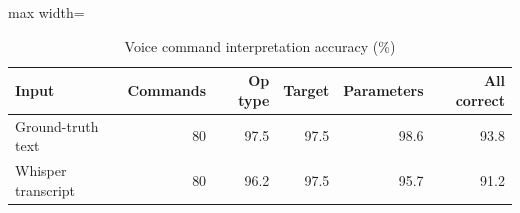 \begin{table}[t]
\centering
\scriptsize
\caption{Voice command interpretation accuracy (\%)}
\label{tab:voice}
\setlength{\tabcolsep}{3.5pt}
\begin{adjustbox}{max width=\columnwidth}
\begin{tabular}{lrrrrr}
\toprule
\textbf{Input} & \textbf{Commands} & \textbf{Op type} & \textbf{Target} & \textbf{Parameters} & \textbf{All correct} \\
\midrule
Ground-truth text & 80 & 97.5 & 97.5 & 98.6 & 93.8 \\
Whisper transcript & 80 & 96.2 & 97.5 & 95.7 & 91.2 \\
\bottomrule
\end{tabular}
\end{adjustbox}
\end{table}
